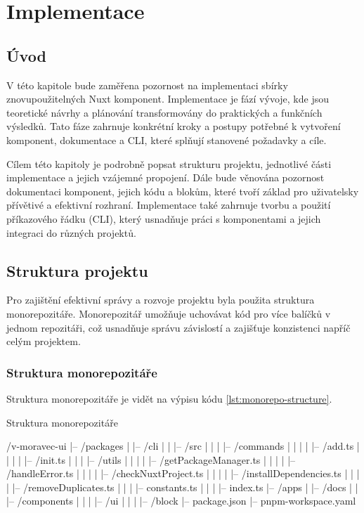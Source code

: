 
\chapter{Implementace}\label{ch:implementation}

\section{Úvod}
V této kapitole bude zaměřena pozornost na implementaci sbírky znovupoužitelných Nuxt komponent. Implementace je fází vývoje, kde jsou teoretické návrhy a plánování transformovány do praktických a funkčních výsledků. Tato fáze zahrnuje konkrétní kroky a postupy potřebné k vytvoření komponent, dokumentace a CLI, které splňují stanovené požadavky a cíle.

Cílem této kapitoly je podrobně popsat strukturu projektu, jednotlivé části implementace a jejich vzájemné propojení. Dále bude věnována pozornost dokumentaci komponent, jejich kódu a blokům, které tvoří základ pro uživatelsky přívětivé a efektivní rozhraní. Implementace také zahrnuje tvorbu a použití příkazového řádku (CLI), který usnadňuje práci s komponentami a jejich integraci do různých projektů.

\section{Struktura projektu}
Pro zajištění efektivní správy a rozvoje projektu byla použita struktura monorepozitáře. Monorepozitář umožňuje uchovávat kód pro více balíčků v jednom repozitáři, což usnadňuje správu závislostí a zajišťuje konzistenci napříč celým projektem.

\subsection{Struktura monorepozitáře}
Struktura monorepozitáře je vidět na výpisu kódu \ref{lst:monorepo-structure}.

\begin{listing}[h]
\caption{Struktura monorepozitáře}
\label{lst:monorepo-structure}
\begin{code}[bash]
/v-moravec-ui
|-- /packages
|   |-- /cli
|   |   |-- /src
|   |   |   |-- /commands
|   |   |   |   |-- /add.ts
|   |   |   |   |-- /init.ts
|   |   |   |-- /utils
|   |   |   |   |-- /getPackageManager.ts
|   |   |   |   |-- /handleError.ts
|   |   |   |   |-- /checkNuxtProject.ts
|   |   |   |   |-- /installDependencies.ts
|   |   |   |   |-- /removeDuplicates.ts
|   |   |   |-- constants.ts
|   |   |   |-- index.ts
|-- /apps
|   |-- /docs
|   |   |-- /components
|   |   |   |-- /ui
|   |   |   |-- /block
|-- package.json
|-- pnpm-workspace.yaml
\end{code}
\end{listing}

